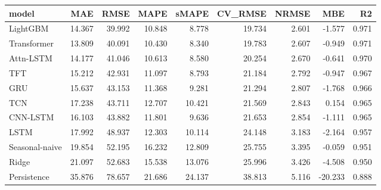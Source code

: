\begin{tabular}{lrrrrrrrr}
\toprule
model & MAE & RMSE & MAPE & sMAPE & CV_RMSE & NRMSE & MBE & R2 \\
\midrule
LightGBM & 14.367 & 39.992 & 10.848 & 8.778 & 19.734 & 2.601 & -1.577 & 0.971 \\
Transformer & 13.809 & 40.091 & 10.430 & 8.340 & 19.783 & 2.607 & -0.949 & 0.971 \\
Attn-LSTM & 14.177 & 41.046 & 10.613 & 8.580 & 20.254 & 2.670 & -0.641 & 0.970 \\
TFT & 15.212 & 42.931 & 11.097 & 8.793 & 21.184 & 2.792 & -0.947 & 0.967 \\
GRU & 15.637 & 43.153 & 11.368 & 9.281 & 21.294 & 2.807 & -1.768 & 0.966 \\
TCN & 17.238 & 43.711 & 12.707 & 10.421 & 21.569 & 2.843 & 0.154 & 0.965 \\
CNN-LSTM & 16.103 & 43.882 & 11.801 & 9.636 & 21.653 & 2.854 & -1.111 & 0.965 \\
LSTM & 17.992 & 48.937 & 12.303 & 10.114 & 24.148 & 3.183 & -2.164 & 0.957 \\
Seasonal-naive & 19.854 & 52.195 & 16.232 & 12.809 & 25.755 & 3.395 & -0.059 & 0.951 \\
Ridge & 21.097 & 52.683 & 15.538 & 13.076 & 25.996 & 3.426 & -4.508 & 0.950 \\
Persistence & 35.876 & 78.657 & 21.686 & 24.137 & 38.813 & 5.116 & -20.233 & 0.888 \\
\bottomrule
\end{tabular}
